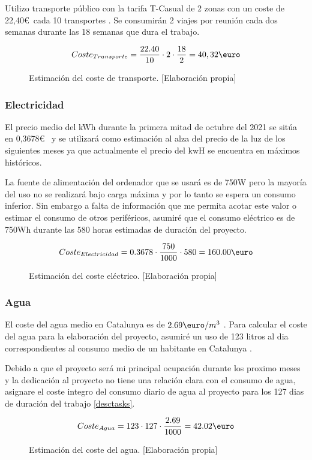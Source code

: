 Utilizo transporte público con la tarifa T-Casual de 2 zonas con un coste de 22,40\euro\ cada 10 transportes
\cite{Tcasualcost}. Se consumirán 2 viajes por reunión cada dos semanas durante las 18 semanas que dura el trabajo.
\begin{figure}[H]
    \begin{align*}
        Coste_{Transporte} = \frac{22.40}{10} \cdot 2 \cdot \frac{18}{2} = 40,32\text{\euro}
    \end{align*}
    \caption{Estimación del coste de transporte.  [Elaboración propia]}
\end{figure}

\subsubsection{Electricidad}
El precio medio del kWh durante la primera mitad de octubre del 2021 se sitúa en 0,3678\euro\ \cite{CosteLuz} y se utilizará como
estimación al alza del precio de la luz de los siguientes meses ya que actualmente el precio del kwH se encuentra
en máximos históricos.

La fuente de alimentación del ordenador que se usará es de 750W pero la mayoría del uso no se realizará bajo carga
máxima y por lo tanto se espera un consumo inferior. Sin embargo a falta de información que me permita acotar
este valor o estimar el consumo de otros periféricos, asumiré que el consumo eléctrico es de 750Wh durante las
580 horas estimadas de duración del proyecto.
\begin{figure}[ht]
    \begin{align*}
        Coste_{Electricidad} = 0.3678 \cdot \frac{750}{1000} \cdot 580 = 160.00\text{\euro}
    \end{align*}
    \caption{Estimación del coste eléctrico.  [Elaboración propia]}
\end{figure}

\subsubsection{Agua}
El coste del agua medio en Catalunya es de \( 2.69\text{\euro}/m^{3} \) \cite{CosteAgua}. Para calcular el coste del agua para
la elaboración del proyecto, asumiré un uso de 123 litros al dia correspondientes al consumo medio de un habitante
en Catalunya \cite{ConsumoAgua}.

Debido a que el proyecto será mi principal ocupación durante los proximo meses y 
la dedicación al proyecto no tiene una relación clara con el consumo de agua, asignare el coste integro del consumo
diario de agua al proyecto para los 127 dias de duración del trabajo \ref{desctasks}.
\begin{figure}[ht]
    \begin{align*}
        Coste_{Agua} = 123 \cdot 127 \cdot \frac{2.69}{1000} = 42.02\text{\euro}
    \end{align*}
    \caption{Estimación del coste del agua.  [Elaboración propia]}
\end{figure}



